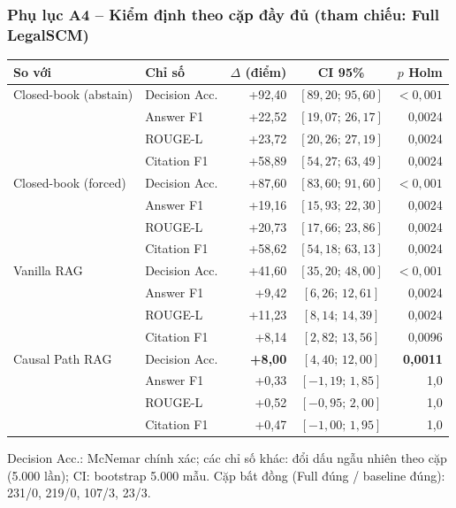 \begin{frame}
\frametitle{Phụ lục A4 -- Kiểm định theo cặp đầy đủ (tham chiếu: Full LegalSCM)}
\vspace{-0.1cm}
\centering
\scriptsize
\setlength{\tabcolsep}{5pt}
\renewcommand{\arraystretch}{0.93}
\begin{tabular}{@{}l l r c r@{}}
\toprule
\textbf{So với} & \textbf{Chỉ số} & \textbf{$\Delta$ (điểm)} & \textbf{CI 95\%} & \textbf{$p$ Holm}\\
\midrule
Closed-book (abstain) & Decision Acc. & +92,40 & $[89{,}20;\,95{,}60]$ & $<0{,}001$\\
 & Answer F1 & +22,52 & $[19{,}07;\,26{,}17]$ & 0,0024\\
 & ROUGE-L & +23,72 & $[20{,}26;\,27{,}19]$ & 0,0024\\
 & Citation F1 & +58,89 & $[54{,}27;\,63{,}49]$ & 0,0024\\
\addlinespace[3pt]
Closed-book (forced) & Decision Acc. & +87,60 & $[83{,}60;\,91{,}60]$ & $<0{,}001$\\
 & Answer F1 & +19,16 & $[15{,}93;\,22{,}30]$ & 0,0024\\
 & ROUGE-L & +20,73 & $[17{,}66;\,23{,}86]$ & 0,0024\\
 & Citation F1 & +58,62 & $[54{,}18;\,63{,}13]$ & 0,0024\\
\addlinespace[3pt]
Vanilla RAG & Decision Acc. & +41,60 & $[35{,}20;\,48{,}00]$ & $<0{,}001$\\
 & Answer F1 & +9,42 & $[6{,}26;\,12{,}61]$ & 0,0024\\
 & ROUGE-L & +11,23 & $[8{,}14;\,14{,}39]$ & 0,0024\\
 & Citation F1 & +8,14 & $[2{,}82;\,13{,}56]$ & 0,0096\\
\addlinespace[3pt]
\rowcolor{schemaLight}Causal Path RAG & Decision Acc. & \textbf{+8,00} & $[4{,}40;\,12{,}00]$ & \textbf{0,0011}\\
 & Answer F1 & +0,33 & $[-1{,}19;\,1{,}85]$ & 1,0\\
 & ROUGE-L & +0,52 & $[-0{,}95;\,2{,}00]$ & 1,0\\
 & Citation F1 & +0,47 & $[-1{,}00;\,1{,}95]$ & 1,0\\
\bottomrule
\end{tabular}

\vspace{0.06cm}
\raggedright
Decision Acc.: McNemar chính xác; các chỉ số khác: đổi dấu ngẫu nhiên theo cặp (5.000 lần); CI: bootstrap 5.000 mẫu.
Cặp bất đồng (Full đúng / baseline đúng): 231/0, 219/0, 107/3, 23/3.
\end{frame}

